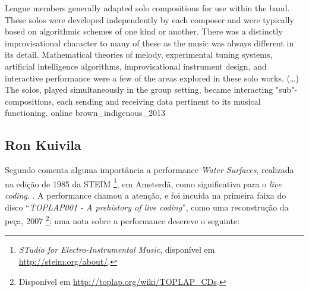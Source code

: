 {League members generally adapted solo compositions for use within the band. These solos were developed independently by each composer and were typically based on algorithmic schemes of one kind or another. There was a distinctly improvisational character to many of these as the music was always different in its detail. Mathematical theories of melody, experimental tuning systems, artificial intelligence algorithms, improvisational instrument design, and interactive performance were a few of the areas explored in these solo works. (\ldots) The solos, played simultaneously in the group setting, became interacting "sub"-compositions, each sending and receiving data pertinent to its musical functioning.}
{online}
{brown_indigenous_2013}


\subsection{Ron Kuivila}

Segundo  comenta alguma importância a performance \emph{Water Surfaces}, realizada na edição de 1985 da STEIM \footnote{\emph{STudio for Electro-Instrumental Music}, disponível em \url{http://steim.org/about/}.}, em Amsterdã, como significativa para o \emph{live coding}. . A performance chamou a atenção, e foi incuída na primeira faixa do disco ``\emph{TOPLAP001 - A prehistory of live coding}'', como uma reconstrução da peça, 2007 \footnote{Disponível em \url{http://toplap.org/wiki/TOPLAP_CDs}.}; uma nota sobre a performance descreve o seguinte: 


